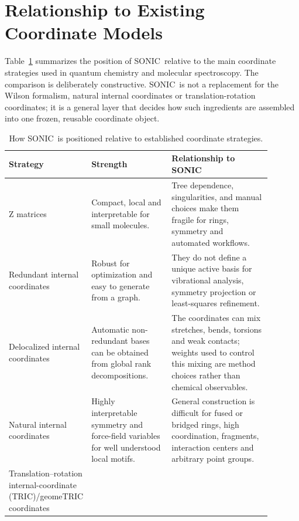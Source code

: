 \documentclass[journal=jctcce,manuscript=article,layout=traditional]{achemso}
\newcommand{\SONIC}{SONIC}
\theoremstyle{definition}
\begin{document}
\section{Relationship to Existing Coordinate Models}

Table~\ref{tab:context} summarizes the position of \SONIC\ relative to the main
coordinate strategies used in quantum chemistry and molecular spectroscopy.
The comparison is deliberately constructive.  \SONIC\ is not a replacement for
the Wilson formalism, natural internal coordinates or translation-rotation
coordinates; it is a general layer that decides how such ingredients are
assembled into one frozen, reusable coordinate object.

\begin{table}[htbp]
\centering
\scriptsize
\setlength{\tabcolsep}{3pt}
\renewcommand{\arraystretch}{0.92}
\caption{How \SONIC\ is positioned relative to established coordinate strategies.}
\label{tab:context}
\begin{tabular}{p{0.19\linewidth}p{0.31\linewidth}p{0.39\linewidth}}
\toprule
Strategy & Strength & Relationship to \SONIC \\
\midrule
Z matrices & Compact, local and interpretable for small molecules. & Tree
dependence, singularities, and manual choices make them fragile for rings,
symmetry and automated workflows.\cite{BakerHehre1991ZMatrix} \\
\midrule
Redundant internal coordinates & Robust for optimization and easy to generate
from a graph.\cite{PulayFogarasi1992,Peng1996Redundant,BakkenHelgaker2002} &
They do not define a unique active basis for vibrational analysis, symmetry
projection or least-squares refinement. \\
\midrule
Delocalized internal coordinates & Automatic non-redundant bases can be
obtained from global rank decompositions.\cite{Baker1996Delocalized} & The
coordinates can mix stretches, bends, torsions and weak contacts; weights used
to control this mixing are method choices rather than chemical observables. \\
\midrule
Natural internal coordinates & Highly interpretable symmetry and force-field
variables for well understood local motifs.\cite{Berces1997NaturalMetal,VonArnimAhlrichs1999GNIC,SwartBickelhaupt2006StrongWeak}
& General construction is difficult for fused or bridged rings, high
coordination, fragments, interaction centers and arbitrary point groups. \\
\midrule
Translation--rotation internal-coordinate (TRIC)/geomeTRIC coordinates &

\end{tabular}
\end{table}
\end{document}
